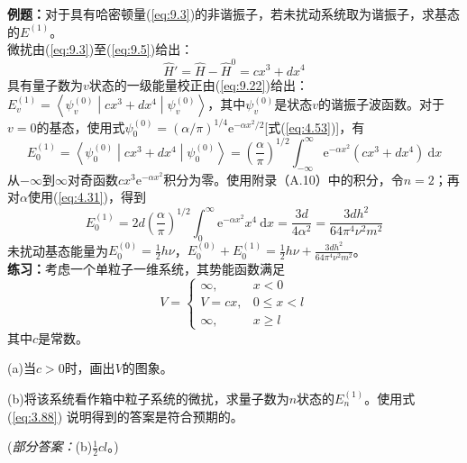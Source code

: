     \begin{examplebox}
        \textbf{例题：}对于具有哈密顿量(\ref{eq:9.3})的非谐振子，若未扰动系统取为谐振子，求基态的$E^{(1)}$。
        \\

        微扰由(\ref{eq:9.3})至(\ref{eq:9.5})给出：
        \begin{equation*}
            \hat{H}' = \hat{H} - \hat{H}^0 = cx^3 + dx^4
        \end{equation*}
        具有量子数为$v$状态的一级能量校正由(\ref{eq:9.22})给出：$E_v^{(1)} = \left\langle \psi_v^{(0)} \middle| cx^3 + dx^4 \middle| \psi_v^{(0)} \right\rangle$，其中$\psi_v^{(0)}$是状态$v$的谐振子波函数。对于$v=0$的基态，使用式$\psi_0^{\left(0\right)} = \left(\alpha /\pi\right)^{1/4} \mathrm{e}^{-\alpha x^2 / 2}$[式(\ref{eq:4.53})]，有
        \begin{equation*}
            E_0^{\left(1\right)} = \left\langle \psi_0^{\left(0\right)} \middle| cx^3 + dx^4 \middle| \psi_0^{\left(0\right)} \right\rangle = \left(\frac{\alpha}{\pi}\right)^{1/2} \int_{-\infty}^{\infty} \mathrm{e}^{-\alpha x^2} \left(cx^3 + dx^4\right) \:\mathrm{d}x
        \end{equation*}
        从$-\infty$到$\infty$对奇函数$cx^3\mathrm{e}^{-\alpha x^2}$积分为零。使用附录（A.10）中的积分，令$n=2$；再对$\alpha$使用(\ref{eq:4.31})，得到
        \begin{equation*}
            E_0^{\left(1\right)} = 2d\left(\frac{\alpha}{\pi}\right)^{1/2} \int_{0}^{\infty} \mathrm{e}^{-\alpha x^2} x^4 \:\mathrm{d}x = \frac{3d}{4\alpha^2} = \frac{3dh^2}{64\pi^4 \nu^2 m^2}
        \end{equation*}
        未扰动基态能量为$E_0^{\left(0\right)} = \frac{1}{2}h\nu$，$E_0^{\left(0\right)} + E_0^{\left(1\right)} = \frac{1}{2}h\nu + \frac{3dh^2}{64\pi^4 \nu^2 m^2}$。
        \\

        \textbf{练习：}考虑一个单粒子一维系统，其势能函数满足
        \begin{equation*}
            V = \begin{cases}
                \infty, & x < 0 \\
                V = cx, & 0 \leq x < l \\
                \infty, & x \geq l
            \end{cases}
        \end{equation*}
        其中$c$是常数。

        (a)当$c>0$时，画出$V$的图象。

        (b)将该系统看作箱中粒子系统的微扰，求量子数为$n$状态的$E_n^{(1)}$。使用式 (\ref{eq:3.88}) 说明得到的答案是符合预期的。

        (\textit{部分答案：}(b)$\frac{1}{2}cl$。)
    \end{examplebox}

